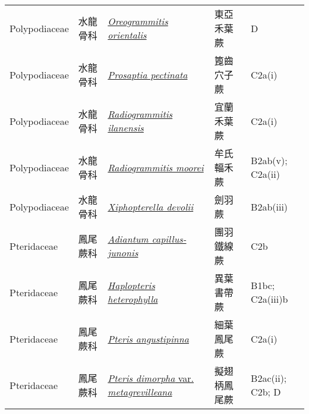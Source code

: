 {\begin{longtable}{p{2.5cm}p{2.5cm}p{4.5cm}p{2.5cm}p{3cm}}
    Polypodiaceae & 水龍骨科 & \href{http://www.theplantlist.org/tpl1.1/search?q=Oreogrammitis+orientalis}{\textit{Oreogrammitis orientalis} } & 東亞禾葉蕨 & D \index{Oreogrammitis@\textit{Oreogrammitis}!orientalis@\textit{orientalis}}  \index{東亞禾葉蕨} \\
    Polypodiaceae & 水龍骨科 & \href{http://www.theplantlist.org/tpl1.1/search?q=Prosaptia+pectinata}{\textit{Prosaptia pectinata} } & 篦齒穴子蕨 & C2a(i) \index{Prosaptia@\textit{Prosaptia}!pectinata@\textit{pectinata}}  \index{篦齒穴子蕨} \\
    Polypodiaceae & 水龍骨科 & \href{http://www.theplantlist.org/tpl1.1/search?q=Radiogrammitis+ilanensis}{\textit{Radiogrammitis ilanensis} } & 宜蘭禾葉蕨 & C2a(i) \index{Radiogrammitis@\textit{Radiogrammitis}!ilanensis@\textit{ilanensis}}  \index{宜蘭禾葉蕨} \\
    Polypodiaceae & 水龍骨科 & \href{http://www.theplantlist.org/tpl1.1/search?q=Radiogrammitis+moorei}{\textit{Radiogrammitis moorei} } & 牟氏輻禾蕨 & B2ab(v); C2a(ii) \index{Radiogrammitis@\textit{Radiogrammitis}!moorei@\textit{moorei}}  \index{牟氏輻禾蕨} \\
    Polypodiaceae & 水龍骨科 & \href{http://www.theplantlist.org/tpl1.1/search?q=Xiphopterella+devolii}{\textit{Xiphopterella devolii} } & 劍羽蕨 & B2ab(iii) \index{Xiphopterella@\textit{Xiphopterella}!devolii@\textit{devolii}}  \index{劍羽蕨} \\
    Pteridaceae & 鳳尾蕨科 & \href{http://www.theplantlist.org/tpl1.1/search?q=Adiantum+capillus-junonis}{\textit{Adiantum capillus-junonis} } & 團羽鐵線蕨 & C2b \index{Adiantum@\textit{Adiantum}!capillus-junonis@\textit{capillus-junonis}}  \index{團羽鐵線蕨} \\
    Pteridaceae & 鳳尾蕨科 & \href{http://www.theplantlist.org/tpl1.1/search?q=Haplopteris+heterophylla}{\textit{Haplopteris heterophylla} } & 異葉書帶蕨 & B1bc; C2a(iii)b \index{Haplopteris@\textit{Haplopteris}!heterophylla@\textit{heterophylla}}  \index{異葉書帶蕨} \\
    Pteridaceae & 鳳尾蕨科 & \href{http://www.theplantlist.org/tpl1.1/search?q=Pteris+angustipinna}{\textit{Pteris angustipinna} } & 細葉鳳尾蕨 & C2a(i) \index{Pteris@\textit{Pteris}!angustipinna@\textit{angustipinna}}  \index{細葉鳳尾蕨} \\
    Pteridaceae & 鳳尾蕨科 & \href{http://www.theplantlist.org/tpl1.1/search?q=Pteris+dimorpha+var.+metagrevilleana}{\textit{Pteris dimorpha} var. \textit{metagrevilleana} } & 擬翅柄鳳尾蕨 & B2ac(ii); C2b; D \index{Pteris@\textit{Pteris}!dimorpha@\textit{dimorpha}!var. metagrevilleana@var. \textit{metagrevilleana}}  \index{擬翅柄鳳尾蕨} \\

\end{longtable}}
